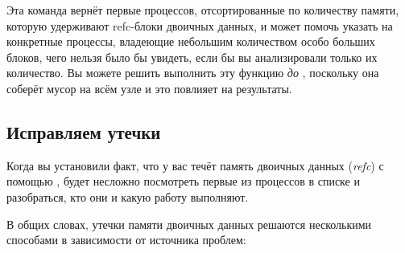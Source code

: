 \documentclass[11pt, oneside]{book}   	%
\begin{document}
Эта команда вернёт первые  процессов, отсортированные по количеству памяти, которую удерживают refc-блоки двоичных данных, и может помочь указать на конкретные процессы, владеющие небольшим количеством особо больших блоков, чего нельзя было бы увидеть, если бы вы анализировали только их количество. Вы можете решить выполнить эту функцию \emph{до} , поскольку она соберёт мусор на всём узле и это повлияет на результаты.


\subsection{Исправляем утечки}

Когда вы установили факт, что у вас течёт память двоичных данных (\emph{refc}) с помощью , будет несложно посмотреть первые из процессов в списке и разобраться, кто они и какую работу выполняют.

В общих словах, утечки памяти двоичных данных решаются несколькими способами в зависимости от источника проблем:
\end{document}
